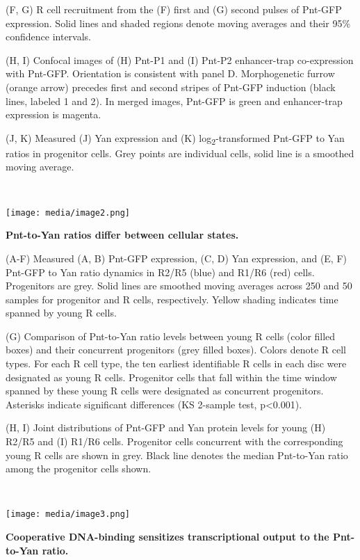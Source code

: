(F, G) R cell recruitment from the (F) first and (G) second pulses of Pnt-GFP expression. Solid lines and shaded regions denote moving averages and their 95\% confidence intervals.

(H, I) Confocal images of (H) Pnt-P1 and (I) Pnt-P2 enhancer-trap co-expression with Pnt-GFP. Orientation is consistent with panel D. Morphogenetic furrow (orange arrow) precedes first and second stripes of Pnt-GFP induction (black lines, labeled 1 and 2). In merged images, Pnt-GFP is green and enhancer-trap expression is magenta.

(J, K) Measured (J) Yan expression and (K) log\textsubscript{2}-transformed Pnt-GFP to Yan ratios in progenitor cells. Grey points are individual cells, solid line is a smoothed moving average.

\textbf{\\
}

\texttt{[image: media/image2.png]}

\textbf{Pnt-to-Yan ratios differ between cellular states.}

(A-F) Measured (A, B) Pnt-GFP expression, (C, D) Yan expression, and (E, F) Pnt-GFP to Yan ratio dynamics in R2/R5 (blue) and R1/R6 (red) cells. Progenitors are grey. Solid lines are smoothed moving averages across 250 and 50 samples for progenitor and R cells, respectively. Yellow shading indicates time spanned by young R cells.

(G) Comparison of Pnt-to-Yan ratio levels between young R cells (color filled boxes) and their concurrent progenitors (grey filled boxes). Colors denote R cell types. For each R cell type, the ten earliest identifiable R cells in each disc were designated as young R cells. Progenitor cells that fall within the time window spanned by these young R cells were designated as concurrent progenitors. Asterisks indicate significant differences (KS 2-sample test, p\textless{}0.001).

(H, I) Joint distributions of Pnt-GFP and Yan protein levels for young (H) R2/R5 and (I) R1/R6 cells. Progenitor cells concurrent with the corresponding young R cells are shown in grey. Black line denotes the median Pnt-to-Yan ratio among the progenitor cells shown.

\textbf{\\
}

\texttt{[image: media/image3.png]}

\textbf{Cooperative DNA-binding sensitizes transcriptional output to the Pnt-to-Yan ratio. }

